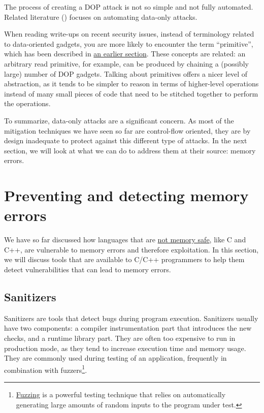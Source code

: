 \documentclass[
  a4paper,
]{report}
\begin{document}
The process of creating a DOP attack is not so simple and not fully
automated. Related literature () focuses on automating data-only attacks.

When reading write-ups on recent security issues, instead of terminology
related to data-oriented gadgets, you are more likely to encounter the
term ``primitive'', which has been described in
\hyperref[exploitation-primitives]{an earlier section}. These concepts
are related: an arbitrary read primitive, for example, can be produced
by chaining a (possibly large) number of DOP gadgets. Talking about
primitives offers a nicer level of abstraction, as it tends to be
simpler to reason in terms of higher-level operations instead of many
small pieces of code that need to be stitched together to perform the
operations.

To summarize, data-only attacks are a significant concern. As most of
the mitigation techniques we have seen so far are control-flow oriented,
they are by design inadequate to protect against this different type of
attacks. In the next section, we will look at what we can do to address
them at their source: memory errors.

\section{Preventing and detecting memory
errors}\label{preventing-and-detecting-memory-errors}

We have so far discussed how languages that are
\hyperref[a-bit-of-background-on-memory-vulnerabilities]{not memory
safe}, like C and C++, are vulnerable to memory errors and therefore
exploitation. In this section, we will discuss tools that are available
to C/C++ programmers to help them detect
vulnerabilities that can lead to memory errors.

\subsection{Sanitizers}\label{sanitizers}

Sanitizers  are tools that detect bugs during program
execution. Sanitizers usually have two components: a compiler
instrumentation part that introduces the new checks, and a runtime
library part. They are often too expensive to run in production mode, as
they tend to increase execution time and memory usage. They are commonly
used during testing of an application, frequently in combination with
fuzzers\footnote{\href{https://en.wikipedia.org/wiki/Fuzzing}{Fuzzing}
   is a powerful testing technique that relies on
  automatically generating large amounts of random inputs to the program
  under test.}.
\end{document}
